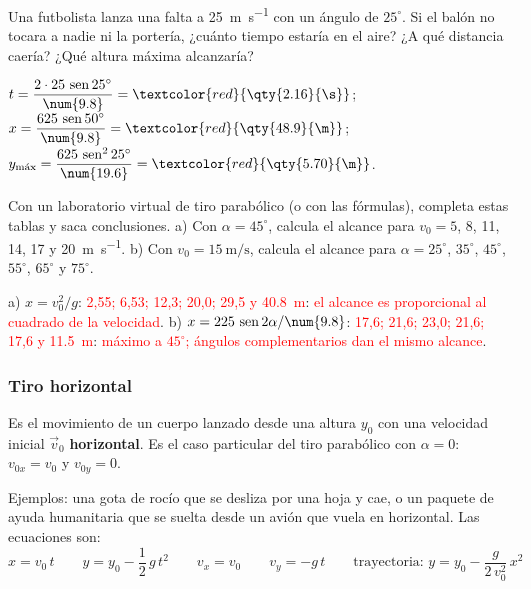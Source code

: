 \begin{exercise}
    Una futbolista lanza una falta a \qty{25}{\m\per\s} con un ángulo de \(25^\circ\). Si el balón no tocara a nadie ni la portería,
    ¿cuánto tiempo estaría en el aire? ¿A qué distancia caería? ¿Qué altura máxima alcanzaría?
    \begin{solu}
        \(t = \dfrac{2 \cdot 25\,\sen 25^\circ}{\num{9.8}} = \textcolor{red}{\qty{2.16}{\s}}\); \(x = \dfrac{625\,\sen 50^\circ}{\num{9.8}} =
        \textcolor{red}{\qty{48.9}{\m}}\); \(y_{\text{máx}} = \dfrac{625\,\sen^2 25^\circ}{\num{19.6}} = \textcolor{red}{\qty{5.70}{\m}}\).
    \end{solu}
\end{exercise}

\begin{exercise}
    Con un laboratorio virtual de tiro parabólico (o con las fórmulas), completa estas tablas y saca conclusiones. a) Con \(\alpha =
    45^\circ\), calcula el alcance para \(v_0 = 5\), 8, 11, 14, 17 y \qty{20}{\m\per\s}. b) Con \(v_0 = \qty{15}{\m\per\s}\), calcula el
    alcance para \(\alpha = 25^\circ\), \(35^\circ\), \(45^\circ\), \(55^\circ\), \(65^\circ\) y \(75^\circ\).
    \begin{solu}
        a) \(x = v_0^2/g\): \textcolor{red}{2,55; 6,53; 12,3; 20,0; 29,5 y \qty{40.8}{\m}}: \textcolor{red}{el alcance es proporcional
        al cuadrado de la velocidad}. b) \(x = 225\,\sen 2\alpha/\num{9.8}\): \textcolor{red}{17,6; 21,6; 23,0; 21,6; 17,6 y
        \qty{11.5}{\m}}: \textcolor{red}{máximo a \(45^\circ\); ángulos complementarios dan el mismo alcance}.
    \end{solu}
\end{exercise}

\subsubsection{Tiro horizontal}

\begin{definition}
    Es el movimiento de un cuerpo lanzado desde una altura \(y_0\) con una velocidad inicial \(\vec v_0\) \textbf{horizontal}. Es el
    caso particular del tiro parabólico con \(\alpha = 0\): \(v_{0x} = v_0\) y \(v_{0y} = 0\).
\end{definition}

Ejemplos: una gota de rocío que se desliza por una hoja y cae, o un paquete de ayuda humanitaria que se suelta desde un avión que
vuela en horizontal. Las ecuaciones son:
\[ x = v_0\,t \qquad y = y_0 - \frac{1}{2}\,g\,t^2 \qquad v_x = v_0 \qquad v_y = -g\,t \qquad
   \text{trayectoria: } y = y_0 - \frac{g}{2\,v_0^2}\,x^2 \]

